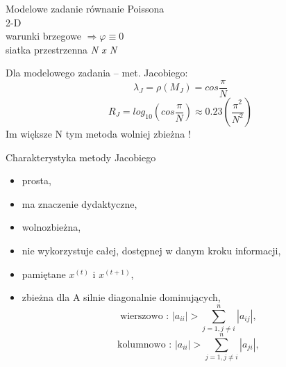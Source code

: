 \begin{frame}{}
  \begin{block}{Modelowe zadanie}
    równanie Poissona
    \\2-D
    \\warunki brzegowe $\Rightarrow\varphi\equiv 0$
    \\siatka przestrzenna \emph{N x N}
  \end{block}

  \begin{block}{Dla modelowego zadania -- met. Jacobiego:}
    $$\lambda _J=\rho(M_J) = cos\frac{\pi}{N}$$
    $$R_J=log_{10}(cos\frac{\pi}{N})\approx 0.23 (\frac{\pi^2}{N^2})
    $$
    Im większe N tym metoda wolniej zbieżna !
  \end{block}
\end{frame}

\begin{frame}{}
  \begin{block}{Charakterystyka metody Jacobiego}
    \begin{itemize}
      \item prosta,
      \item ma znaczenie dydaktyczne,
      \item wolnozbieżna,
      \item nie wykorzystuje całej, dostępnej w danym kroku informacji,
      \item pamiętane $x^{(t)}$ i $x^{(t+1)}$,
      \item zbieżna dla A silnie diagonalnie dominujących,
      $$\text{wierszowo : }|a_{ii}| > \sum_{j=1,j\neq i}^{n} |a_{ij}|,$$
      $$\text{kolumnowo : }|a_{ii}| > \sum_{j=1,j\neq i}^{n} |a_{ji}|,$$
    \end{itemize}
  \end{block}
\end{frame}
